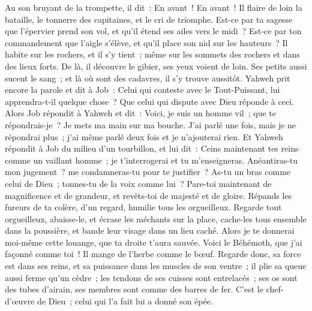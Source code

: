 \begin{multicols}{2}
Au son bruyant de la trompette, il dit~: En avant~! En avant~! Il flaire de loin la bataille, le tonnerre des capitaines, et le cri de triomphe.
Est-ce par ta sagesse que l'épervier prend son vol, et qu'il étend ses ailes vers le midi~?
Est-ce par ton commandement que l'aigle s'élève, et qu'il place son nid sur les hauteurs~?
Il habite sur les rochers, et il s'y tient~; même sur les sommets des rochers et dans des lieux forts.
De là, il découvre le gibier, ses yeux voient de loin.
Ses petits aussi sucent le sang~; et là où sont des cadavres, il s'y trouve aussitôt.
Yahweh prit encore la parole et dit à Job~:
Celui qui conteste avec le Tout-Puissant, lui apprendra-t-il quelque chose~? Que celui qui dispute avec Dieu réponde à ceci.
Alors Job répondit à Yahweh et dit~:
Voici, je suis un homme vil~; que te répondrais-je~? Je mets ma main sur ma bouche.
J'ai parlé une fois, mais je ne répondrai plus~; j'ai même parlé deux fois et je n'ajouterai rien.
\VerseOne{}Et Yahweh répondit à Job du milieu d'un tourbillon, et lui dit~:
Ceins maintenant tes reins comme un vaillant homme~; je t'interrogerai et tu m'enseigneras.
Anéantiras-tu mon jugement~? me condamneras-tu pour te justifier~?
As-tu un bras comme celui de Dieu~; tonnes-tu de la voix comme lui~?
Pare-toi maintenant de magnificence et de grandeur, et revêts-toi de majesté et de gloire.
Répands les fureurs de ta colère, d'un regard, humilie tous les orgueilleux.
Regarde tout orgueilleux, abaisse-le, et écrase les méchants sur la place,
cache-les tous ensemble dans la poussière, et bande leur visage dans un lieu caché.
Alors je te donnerai moi-même cette louange, que ta droite t'aura sauvée.
Voici le Béhémoth, que j'ai façonné comme toi~! Il mange de l'herbe comme le bœuf.
Regarde donc, sa force est dans ses reins, et sa puissance dans les muscles de son ventre~;
il plie sa queue aussi ferme qu'un cèdre~; les tendons de ses cuisses sont entrelacés~;
ses os sont des tubes d'airain, ses membres sont comme des barres de fer.
C'est le chef-d'œuvre de Dieu~; celui qui l'a fait lui a donné son épée.

\end{multicols}
